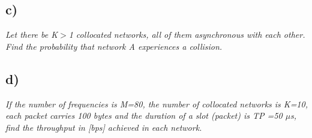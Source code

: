 \subsection{c)}
\textit{Let there be K$>$1 collocated networks, all of them asynchronous with each other. Find the probability that network A experiences a collision.}


\subsection{d)}
\textit{If the number of frequencies is M=80, the number of collocated networks is K=10, each packet carries 100 bytes and the duration of a slot (packet) is TP =50 $\mu$s, find the throughput in [bps] achieved in each network.}
